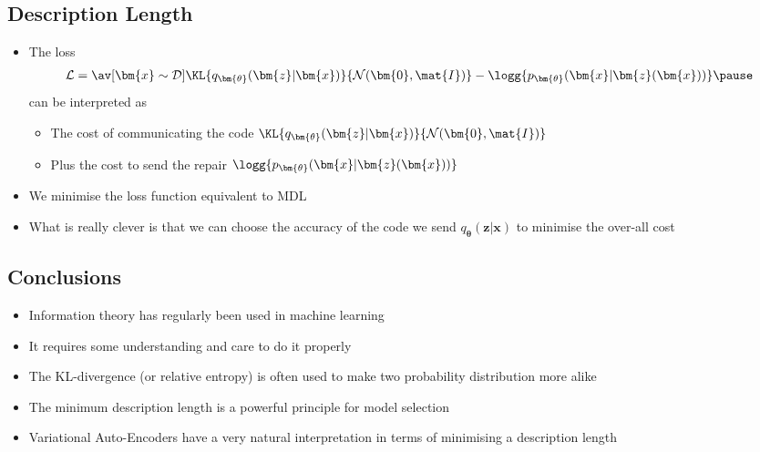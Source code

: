\begin{slide}
\section[-1]{Description Length}

\begin{PauseHighLight}
  \begin{itemize}
  \item The loss
    \begin{align*}
      \mathcal{L} =
      \av[\bm{x}\sim\mathcal{D}]{
      \KL{q_{\bm{\theta}}(\bm{z}|\bm{x})}{\mathcal{N}(\bm{0},\mat{I})}
      - \logg{p_{\bm{\theta}}(\bm{x}|\bm{z}(\bm{x}))}}\pause
    \end{align*}
    can be interpreted as
    \begin{itemize}
    \item The cost of communicating the code
      $\KL{q_{\bm{\theta}}(\bm{z}|\bm{x})}{\mathcal{N}(\bm{0},\mat{I})}$\pause
    \item Plus the cost to send the repair $ \logg{p_{\bm{\theta}}(\bm{x}|\bm{z}(\bm{x}))}$\pause
    \end{itemize}
  \item We minimise the loss function\pause{} equivalent to MDL\pauseb
  \item What is really clever is that we can choose the accuracy of
    the code we send $q_{\bm{\theta}}(\bm{z}|\bm{x})$ to minimise the
    over-all cost\pause
  \end{itemize}
\end{PauseHighLight}

\end{slide}



\begin{slide}
\section{Conclusions}

\begin{PauseHighLight}
  \begin{itemize}
  \item Information theory has regularly been used in machine
    learning\pause
  \item It requires some understanding and care to do it
    properly\pause
  \item The KL-divergence (or relative entropy) is often used to make
    two probability distribution more alike\pause
  \item The minimum description length is a powerful principle for
    model selection\pause
  \item Variational Auto-Encoders have a very natural interpretation
    in terms of minimising a description length\pause
  \end{itemize}
\end{PauseHighLight}


\end{slide}


